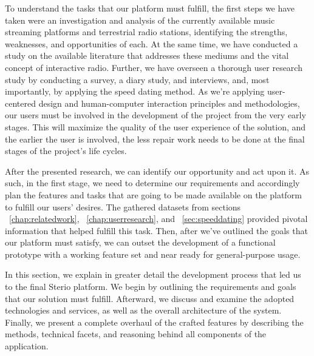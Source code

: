 \cleardoublepage
\label{chap:steriosystem}

To understand the tasks that our platform must fulfill, the first steps we have taken were an investigation and analysis of the currently available music streaming platforms and terrestrial radio stations, identifying the strengths, weaknesses, and opportunities of each. At the same time, we have conducted a study on the available literature that addresses these mediums and the vital concept of interactive radio. Further, we have overseen a thorough user research study by conducting a survey, a diary study, and interviews, and, most importantly, by applying the speed dating method. As we're applying user-centered design and human-computer interaction principles and methodologies, our users must be involved in the development of the project from the very early stages. This will maximize the quality of the user experience of the solution, and the earlier the user is involved, the less repair work needs to be done at the final stages of the project's life cycles.~\cite{Courage2005}

After the presented research, we can identify our opportunity and act upon it. As such, in the first stage, we need to determine our requirements and accordingly plan the features and tasks that are going to be made available on the platform to fulfill our users' desires. The gathered datasets from sections ~\ref{chap:relatedwork}, ~\ref{chap:userresearch}, and ~\ref{sec:speeddating} provided pivotal information that helped fulfill this task. Then, after we've outlined the goals that our platform must satisfy, we can outset the development of a functional prototype with a working feature set and near ready for general-purpose usage.

In this section, we explain in greater detail the development process that led us to the final Sterio platform. We begin by outlining the requirements and goals that our solution must fulfill. Afterward, we discuss and examine the adopted technologies and services, as well as the overall architecture of the system. Finally, we present a complete overhaul of the crafted features by describing the methods, technical facets, and reasoning behind all components of the application.


